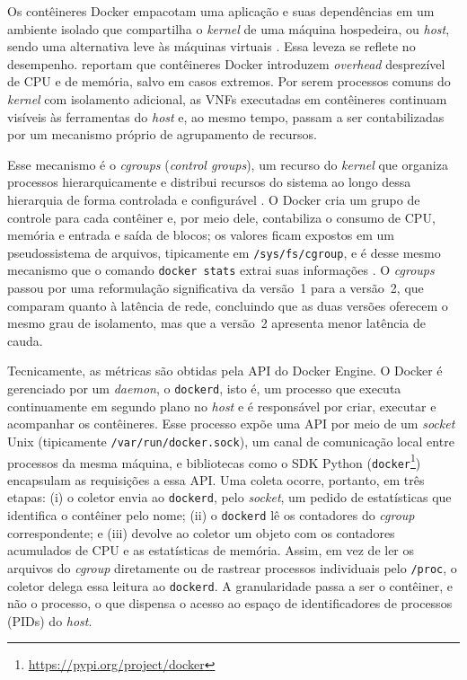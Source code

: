 Os contêineres Docker empacotam uma aplicação e suas dependências em um ambiente isolado que compartilha o \textit{kernel} de uma máquina hospedeira, ou \textit{host}, sendo uma alternativa leve às máquinas virtuais \cite{merkel2014docker}. Essa leveza se reflete no desempenho.  reportam que contêineres Docker introduzem \textit{overhead} desprezível de CPU e de memória, salvo em casos extremos. Por serem processos comuns do \textit{kernel} com isolamento adicional, as VNFs executadas em contêineres continuam visíveis às ferramentas do \textit{host} e, ao mesmo tempo, passam a ser contabilizadas por um mecanismo próprio de agrupamento de recursos.

Esse mecanismo é o \textit{cgroups} (\textit{control groups}), um recurso do \textit{kernel} que organiza processos hierarquicamente e distribui recursos do sistema ao longo dessa hierarquia de forma controlada e configurável \cite{kernel_cgroup_v2}. O Docker cria um grupo de controle para cada contêiner e, por meio dele, contabiliza o consumo de CPU, memória e entrada e saída de blocos; os valores ficam expostos em um pseudossistema de arquivos, tipicamente em \texttt{/sys/fs/cgroup}, e é desse mesmo mecanismo que o comando \texttt{docker stats} extrai suas informações \cite{docker_runmetrics}. O \textit{cgroups} passou por uma reformulação significativa da versão~1 para a versão~2, que  comparam quanto à latência de rede, concluindo que as duas versões oferecem o mesmo grau de isolamento, mas que a versão~2 apresenta menor latência de cauda.

Tecnicamente, as métricas são obtidas pela API do Docker Engine. O Docker é gerenciado por um \textit{daemon}, o \texttt{dockerd}, isto é, um processo que executa continuamente em segundo plano no \textit{host} e é responsável por criar, executar e acompanhar os contêineres. Esse processo expõe uma API por meio de um \textit{socket} Unix (tipicamente \texttt{/var/run/docker.sock}), um canal de comunicação local entre processos da mesma máquina, e bibliotecas como o SDK Python (\texttt{docker}\footnote{\url{https://pypi.org/project/docker}}) encapsulam as requisições a essa API. Uma coleta ocorre, portanto, em três etapas: (i) o coletor envia ao \texttt{dockerd}, pelo \textit{socket}, um pedido de estatísticas que identifica o contêiner pelo nome; (ii) o \texttt{dockerd} lê os contadores do \textit{cgroup} correspondente; e (iii) devolve ao coletor um objeto com os contadores acumulados de CPU e as estatísticas de memória. Assim, em vez de ler os arquivos do \textit{cgroup} diretamente ou de rastrear processos individuais pelo \texttt{/proc}, o coletor delega essa leitura ao \texttt{dockerd}. A granularidade passa a ser o contêiner, e não o processo, o que dispensa o acesso ao espaço de identificadores de processos (PIDs) do \textit{host}.

